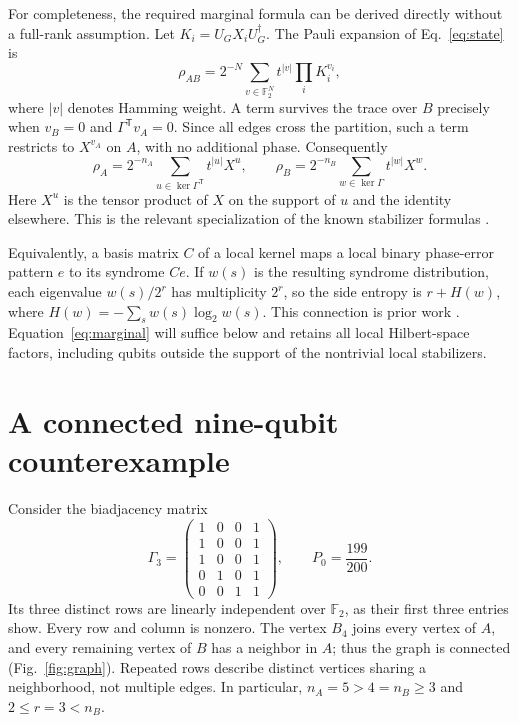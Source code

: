 \documentclass[11pt,a4paper]{article}
\newcommand{\F}{\mathbb F_2}
\begin{document}
For completeness, the required marginal formula can be derived directly without
a full-rank assumption. Let $K_i=U_GX_iU_G^\dagger$. The Pauli expansion of
Eq.~\eqref{eq:state} is
\begin{equation}
 \rho_{AB}=2^{-N}\sum_{v\in\F^N}t^{|v|}\prod_i K_i^{v_i},
 \label{eq:pauli}
\end{equation}
where $|v|$ denotes Hamming weight. A term survives the trace over $B$ precisely
when $v_B=0$ and $\Gamma^{\mathsf T}v_A=0$. Since all edges cross the
partition, such a term restricts to $X^{v_A}$ on $A$, with no additional phase.
Consequently
\begin{equation}
 \rho_A=2^{-n_A}\sum_{u\in\ker\Gamma^{\mathsf T}}t^{|u|}X^u,
 \qquad
 \rho_B=2^{-n_B}\sum_{w\in\ker\Gamma}t^{|w|}X^w.
 \label{eq:marginal}
\end{equation}
Here $X^u$ is the tensor product of $X$ on the support of $u$ and the identity
elsewhere. This is the relevant specialization of the known stabilizer formulas
\cite[Eq.~(23) and Appendix~A]{Sajjad2026lowerbounds}.

Equivalently, a basis matrix $C$ of a local kernel maps a local binary phase-error
pattern $e$ to its syndrome $Ce$. If $w(s)$ is the resulting syndrome
distribution, each eigenvalue $w(s)/2^r$ has multiplicity $2^r$, so the side
entropy is $r+H(w)$, where $H(w)=-\sum_s w(s)\log_2w(s)$.
This connection is prior work
\cite{Sajjad2026lowerbounds,Goodenough2024}. Equation~\eqref{eq:marginal}
will suffice below and retains all local Hilbert-space factors, including qubits
outside the support of the nontrivial local stabilizers.

\section{A connected nine-qubit counterexample}\label{sec:witness}

Consider the biadjacency matrix
\begin{equation}
 \Gamma_3=\begin{pmatrix}
 1&0&0&1\\
 1&0&0&1\\
 1&0&0&1\\
 0&1&0&1\\
 0&0&1&1
 \end{pmatrix},\qquad P_0=\frac{199}{200}.
 \label{eq:witness}
\end{equation}
Its three distinct rows are linearly independent over $\F$, as their first
three entries show. Every row and column is nonzero. The vertex $B_4$ joins
every vertex of $A$, and every remaining vertex of $B$ has a neighbor in $A$;
thus the graph is connected (Fig.~\ref{fig:graph}). Repeated rows describe
distinct vertices sharing a neighborhood, not multiple edges. In particular,
$n_A=5>4=n_B\geq3$ and $2\leq r=3<n_B$.
\end{document}

